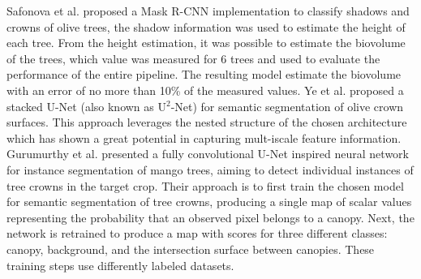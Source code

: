 \documentclass[comsoc,final]{IEEEtran}
\begin{document}
Safonova et al. \cite{s21051617} proposed a Mask R-CNN implementation to classify shadows and crowns of olive trees, the shadow information was used to estimate the height of each tree.
From the height estimation, it was possible to estimate the biovolume of the trees, which value was measured for 6 trees and used to evaluate the performance of the entire pipeline. The resulting model estimate the biovolume with an error of no more than 10\% of the measured values.%
%
 Ye et al. \cite{rs14061523} proposed a stacked U-Net (also known as U$^2$-Net) for semantic segmentation of olive crown surfaces. This approach leverages the nested structure of the chosen architecture which has shown a great potential in capturing mult-iscale feature information.
Gurumurthy et al. \cite{gurumurthy_mango_2019} presented a fully convolutional U-Net inspired neural network for instance segmentation of mango trees, aiming to detect individual instances of tree crowns in the target crop. Their approach is to first train the chosen model for semantic segmentation of tree crowns, producing a single map of scalar values representing the probability that an observed pixel belongs to a canopy. Next, the network is retrained to produce a map with scores for three different classes: canopy, background, and the intersection surface between canopies. These training steps use differently labeled datasets.
\end{document}
